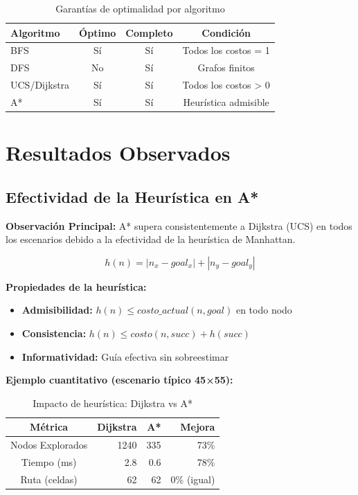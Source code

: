 \documentclass[12pt,a4paper]{article}
\begin{document}
\begin{table}[H]
\centering
\caption{Garantías de optimalidad por algoritmo}
\begin{tabular}{|l|c|c|c|}
\hline
\textbf{Algoritmo} & \textbf{Óptimo} & \textbf{Completo} & \textbf{Condición} \\
\hline
BFS & Sí & Sí & Todos los costos = 1 \\
\hline
DFS & No & Sí & Grafos finitos \\
\hline
UCS/Dijkstra & Sí & Sí & Todos los costos > 0 \\
\hline
A* & Sí & Sí & Heurística admisible \\
\hline
\end{tabular}
\end{table}

\section{Resultados Observados}

\subsection{Efectividad de la Heurística en A*}

\textbf{Observación Principal:} A* supera consistentemente a Dijkstra (UCS) en todos los escenarios debido a la efectividad de la heurística de Manhattan.

\begin{equation}
    h(n) = |n_x - goal_x| + |n_y - goal_y|
\end{equation}

\textbf{Propiedades de la heurística:}
\begin{itemize}
    \item \textbf{Admisibilidad:} $h(n) \leq costo\_actual(n, goal)$ en todo nodo
    \item \textbf{Consistencia:} $h(n) \leq costo(n, succ) + h(succ)$
    \item \textbf{Informatividad:} Guía efectiva sin sobreestimar
\end{itemize}

\textbf{Ejemplo cuantitativo (escenario típico 45×55):}

\begin{table}[H]
\centering
\caption{Impacto de heurística: Dijkstra vs A*}
\begin{tabular}{|c|r|r|r|}
\hline
\textbf{Métrica} & \textbf{Dijkstra} & \textbf{A*} & \textbf{Mejora} \\
\hline
Nodos Explorados & 1240 & 335 & 73\% \\
\hline
Tiempo (ms) & 2.8 & 0.6 & 78\% \\
\hline
Ruta (celdas) & 62 & 62 & 0\% (igual) \\
\hline
\end{tabular}
\end{table}
\end{document}
